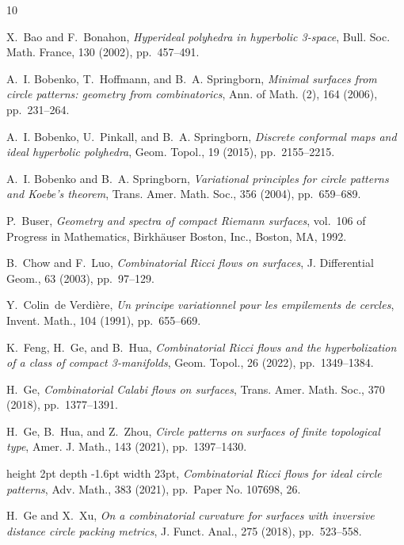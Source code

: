 \documentclass[11pt,leqno]{article}
\numberwithin{equation}{section}
\theoremstyle{definition}
\begin{document}

%
\begin{thebibliography}{10}

{\sc X.~Bao and F.~Bonahon}, {\em Hyperideal polyhedra in hyperbolic 3-space},
  Bull. Soc. Math. France, 130 (2002), pp.~457--491.

{\sc A.~I. Bobenko, T.~Hoffmann, and B.~A. Springborn}, {\em Minimal surfaces
  from circle patterns: geometry from combinatorics}, Ann. of Math. (2), 164
  (2006), pp.~231--264.

{\sc A.~I. Bobenko, U.~Pinkall, and B.~A. Springborn}, {\em Discrete conformal
  maps and ideal hyperbolic polyhedra}, Geom. Topol., 19 (2015),
  pp.~2155--2215.

{\sc A.~I. Bobenko and B.~A. Springborn}, {\em Variational principles for
  circle patterns and {K}oebe's theorem}, Trans. Amer. Math. Soc., 356 (2004),
  pp.~659--689.

{\sc P.~Buser}, {\em Geometry and spectra of compact {R}iemann surfaces},
  vol.~106 of Progress in Mathematics, Birkh\"auser Boston, Inc., Boston, MA,
  1992.

{\sc B.~Chow and F.~Luo}, {\em Combinatorial {R}icci flows on surfaces}, J.
  Differential Geom., 63 (2003), pp.~97--129.

{\sc Y.~Colin~de Verdi\`ere}, {\em Un principe variationnel pour les
  empilements de cercles}, Invent. Math., 104 (1991), pp.~655--669.

{\sc K.~Feng, H.~Ge, and B.~Hua}, {\em Combinatorial {R}icci flows and the
  hyperbolization of a class of compact 3-manifolds}, Geom. Topol., 26 (2022),
  pp.~1349--1384.

{\sc H.~Ge}, {\em Combinatorial {C}alabi flows on surfaces}, Trans. Amer. Math.
  Soc., 370 (2018), pp.~1377--1391.

{\sc H.~Ge, B.~Hua, and Z.~Zhou}, {\em Circle patterns on surfaces of finite
  topological type}, Amer. J. Math., 143 (2021), pp.~1397--1430.

\leavevmode\vrule height 2pt depth -1.6pt width 23pt, {\em Combinatorial
  {R}icci flows for ideal circle patterns}, Adv. Math., 383 (2021), pp.~Paper
  No. 107698, 26.

{\sc H.~Ge and X.~Xu}, {\em On a combinatorial curvature for surfaces with
  inversive distance circle packing metrics}, J. Funct. Anal., 275 (2018),
  pp.~523--558.


\end{thebibliography}
\end{document}
